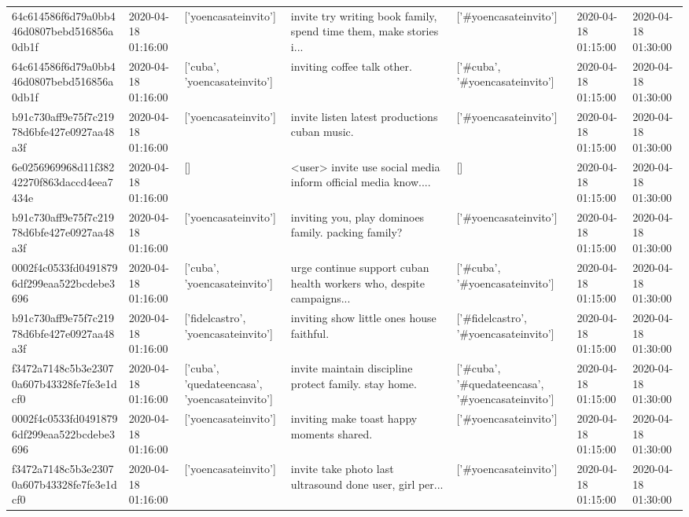 \begin{tabular}{lllllll}
64c614586f6d79a0bb446d0807bebd516856a0db1f & 2020-04-18 01:16:00 & ['yoencasateinvito'] & invite try writing book family, spend time them, make stories i... & ['#yoencasateinvito'] & 2020-04-18 01:15:00 & 2020-04-18 01:30:00 \\
64c614586f6d79a0bb446d0807bebd516856a0db1f & 2020-04-18 01:16:00 & ['cuba', 'yoencasateinvito'] & inviting coffee talk other. & ['#cuba', '#yoencasateinvito'] & 2020-04-18 01:15:00 & 2020-04-18 01:30:00 \\
b91c730aff9e75f7c21978d6bfe427e0927aa48a3f & 2020-04-18 01:16:00 & ['yoencasateinvito'] & invite listen latest productions cuban music. & ['#yoencasateinvito'] & 2020-04-18 01:15:00 & 2020-04-18 01:30:00 \\
6e0256969968d11f38242270f863daccd4eea7434e & 2020-04-18 01:16:00 & [] & <user> invite use social media inform official media know.... & [] & 2020-04-18 01:15:00 & 2020-04-18 01:30:00 \\
b91c730aff9e75f7c21978d6bfe427e0927aa48a3f & 2020-04-18 01:16:00 & ['yoencasateinvito'] & inviting you, play dominoes family. packing family? & ['#yoencasateinvito'] & 2020-04-18 01:15:00 & 2020-04-18 01:30:00 \\
0002f4c0533fd04918796df299eaa522bcdebe3696 & 2020-04-18 01:16:00 & ['cuba', 'yoencasateinvito'] & urge continue support cuban health workers who, despite campaigns... & ['#cuba', '#yoencasateinvito'] & 2020-04-18 01:15:00 & 2020-04-18 01:30:00 \\
b91c730aff9e75f7c21978d6bfe427e0927aa48a3f & 2020-04-18 01:16:00 & ['fidelcastro', 'yoencasateinvito'] & inviting show little ones house faithful. & ['#fidelcastro', '#yoencasateinvito'] & 2020-04-18 01:15:00 & 2020-04-18 01:30:00 \\
f3472a7148c5b3e23070a607b43328fe7fe3e1dcf0 & 2020-04-18 01:16:00 & ['cuba', 'quedateencasa', 'yoencasateinvito'] & invite maintain discipline protect family. stay home. & ['#cuba', '#quedateencasa', '#yoencasateinvito'] & 2020-04-18 01:15:00 & 2020-04-18 01:30:00 \\
0002f4c0533fd04918796df299eaa522bcdebe3696 & 2020-04-18 01:16:00 & ['yoencasateinvito'] & inviting make toast happy moments shared. & ['#yoencasateinvito'] & 2020-04-18 01:15:00 & 2020-04-18 01:30:00 \\
f3472a7148c5b3e23070a607b43328fe7fe3e1dcf0 & 2020-04-18 01:16:00 & ['yoencasateinvito'] & invite take photo last ultrasound done user, girl per... & ['#yoencasateinvito'] & 2020-04-18 01:15:00 & 2020-04-18 01:30:00 \\

\end{tabular}
